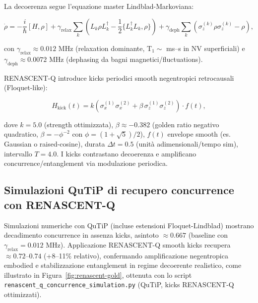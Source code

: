 \documentclass[11pt,a4paper]{article}
\let\oldref\ref
\renewcommand{\ref}{\protect\oldref}
\theoremstyle{plain}
\theoremstyle{definition}
\begin{document}
\vspace{0.2cm}

La decoerenza segue l'equazione master Lindblad-Markoviana:

\begin{equation}
    \dot{\rho} = -\frac{i}{\hbar} [H, \rho] + \gamma_{\text{relax}} \sum_k \left( L_k \rho L_k^\dagger - \frac{1}{2} \{L_k^\dagger L_k, \rho\} \right) + \gamma_{\text{deph}} \sum_k \left( \sigma_z^{(k)} \rho \sigma_z^{(k)} - \rho \right),
    \label{eq:lindblad-base}
\end{equation}

con $\gamma_{\text{relax}} \approx 0.012$ MHz (relaxation dominante, T$_1 \sim$ ms–s in NV superficiali) e $\gamma_{\text{deph}} \approx 0.0072$ MHz (dephasing da bagni magnetici/fluctuations).

\vspace{0.4cm}

RENASCENT-Q introduce kicks periodici smooth negentropici retrocausali (Floquet-like):

\begin{equation}
    H_{\text{kick}}(t) = k \left( \sigma_x^{(1)} \sigma_x^{(2)} + \beta \, \sigma_z^{(1)} \sigma_z^{(2)} \right) \cdot f(t),
    \label{eq:kick-ham}
\end{equation}

\vspace{0.2cm}

dove $k = 5.0$ (strength ottimizzata), $\beta \approx -0.382$ (golden ratio negativo quadratico, $\beta = -\phi^{-2}$ con $\phi = (1+\sqrt{5})/2$), $f(t)$ envelope smooth (es. Gaussian o raised-cosine), durata $\Delta t = 0.5$ (unità adimensionali/tempo sim), intervallo $T = 4.0$. I kicks contrastano decoerenza e amplificano concurrence/entanglement via modulazione periodica.


\vspace{0.5cm}

\subsection{Simulazioni QuTiP di recupero concurrence con RENASCENT-Q}
\label{sec:sims-concurrence}

Simulazioni numeriche con QuTiP (incluse estensioni Floquet-Lindblad) mostrano decadimento concurrence in assenza kicks, asintoto $\approx 0.667$ (baseline con $\gamma_{\text{relax}} = 0.012$ MHz). Applicazione RENASCENT-Q smooth kicks recupera $\approx 0.72$–$0.74$ (+8–11\% relativo), confermando amplificazione negentropica embodied e stabilizzazione entanglement in regime decoerente realistico, come illustrato in Figura~\ref{fig:renascent-gold}, ottenuta con lo script \texttt{renascent\_q\_concurrence\_simulation.py} (QuTiP, kicks RENASCENT-Q ottimizzati).
\end{document}
